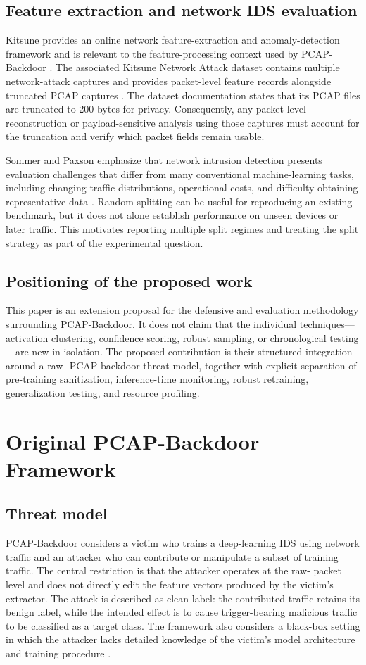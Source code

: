 \documentclass[11pt]{article}
\begin{document}
\subsection{Feature extraction and network IDS evaluation}
Kitsune provides an online network feature-extraction and anomaly-detection framework and is relevant to the feature-processing context used by PCAP-Backdoor \cite{ref8}. The associated Kitsune Network Attack dataset contains multiple network-attack captures and provides packet-level feature records alongside truncated PCAP captures \cite{ref10}. The dataset documentation states that its PCAP files are truncated to 200 bytes for privacy. Consequently, any packet-level reconstruction or payload-sensitive analysis using those captures must account for the truncation and verify which packet fields remain usable.

Sommer and Paxson emphasize that network intrusion detection presents evaluation challenges that differ from many conventional machine-learning tasks, including changing traffic distributions, operational costs, and difficulty obtaining representative data \cite{ref2}. Random splitting can be useful for reproducing an existing benchmark, but it does not alone establish performance on unseen devices or later traffic. This motivates reporting multiple split regimes and treating the split strategy as part of the experimental question.

\subsection{Positioning of the proposed work}
This paper is an extension proposal for the defensive and evaluation methodology surrounding PCAP-Backdoor. It does not claim that the individual techniques---activation clustering, confidence scoring, robust sampling, or chronological testing---are new in isolation. The proposed contribution is their structured integration around a raw- PCAP backdoor threat model, together with explicit separation of pre-training sanitization, inference-time monitoring, robust retraining, generalization testing, and resource profiling.

\section{Original PCAP-Backdoor Framework}
\subsection{Threat model}
PCAP-Backdoor considers a victim who trains a deep-learning IDS using network traffic and an attacker who can contribute or manipulate a subset of training traffic. The central restriction is that the attacker operates at the raw- packet level and does not directly edit the feature vectors produced by the victim's extractor. The attack is described as clean-label: the contributed traffic retains its benign label, while the intended effect is to cause trigger-bearing malicious traffic to be classified as a target class. The framework also considers a black-box setting in which the attacker lacks detailed knowledge of the victim's model architecture and training procedure \cite{ref1}.
\end{document}
